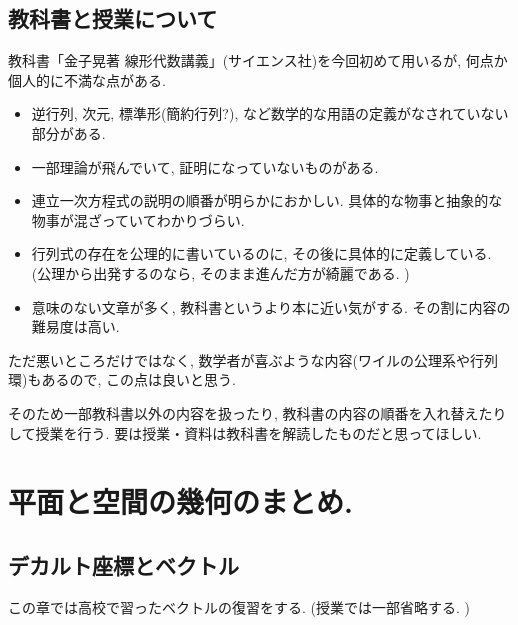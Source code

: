 \documentclass[dvipdfmx,a4paper,11pt]{article}
\theoremstyle{definition}
\newtheorem{dfn}[thm]{定義}
\begin{document}
\subsection{教科書と授業について}
教科書「金子晃著 線形代数講義」(サイエンス社)を今回初めて用いるが, 何点か個人的に不満な点がある.
    \begin{itemize}
      \setlength{\parskip}{0cm} 
  \setlength{\itemsep}{0cm}
    \item 逆行列, 次元, 標準形(簡約行列?), など数学的な用語の定義がなされていない部分がある.
    \item 一部理論が飛んでいて, 証明になっていないものがある. %
    \item 連立一次方程式の説明の順番が明らかにおかしい. 具体的な物事と抽象的な物事が混ざっていてわかりづらい.
    \item 行列式の存在を公理的に書いているのに, その後に具体的に定義している. (公理から出発するのなら, そのまま進んだ方が綺麗である. )
    \item 意味のない文章が多く, 教科書というより本に近い気がする. その割に内容の難易度は高い.
     \end{itemize}
ただ悪いところだけではなく, 数学者が喜ぶような内容(ワイルの公理系や行列環)もあるので, この点は良いと思う.

そのため一部教科書以外の内容を扱ったり, 教科書の内容の順番を入れ替えたりして授業を行う.
要は授業・資料は教科書を解読したものだと思ってほしい. 

\newpage 
\section{平面と空間の幾何のまとめ. \cite[1章]{M}}


\subsection{デカルト座標とベクトル \cite[1.1節]{M}} 
この章では高校で習ったベクトルの復習をする. (授業では一部省略する. )

\end{document}
